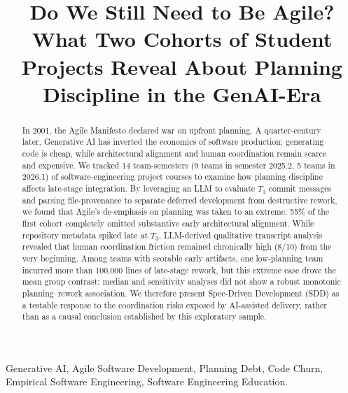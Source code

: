 \documentclass[conference]{IEEEtran}
\begin{document}
\raggedbottom

\title{Do We Still Need to Be Agile? What Two Cohorts of Student Projects Reveal About Planning Discipline in the GenAI-Era}

\author{
}

\maketitle

\begin{abstract}
In 2001, the Agile Manifesto declared war on upfront planning. A
quarter-century later, Generative AI has inverted the economics of
software production: generating code is cheap, while architectural 
alignment and human coordination remain scarce and expensive. We tracked
14 team-semesters (9 teams in semester 2025.2, 5 teams in 2026.1) of
software-engineering project courses to examine how planning discipline 
affects late-stage integration. By leveraging an LLM to evaluate $T_1$ 
commit messages and parsing file-provenance to separate deferred development 
from destructive rework, we found that Agile's de-emphasis on planning 
was taken to an extreme: 55\% of the first cohort completely omitted 
substantive early architectural alignment. While repository metadata 
spiked late at $T_3$, LLM-derived qualitative transcript analysis revealed 
that human coordination friction remained chronically high (8/10) from the 
very beginning. Among teams with scorable early artifacts, one low-planning
team incurred more than 100,000 lines of late-stage rework, but this extreme
case drove the mean group contrast: median and sensitivity analyses did not
show a robust monotonic planning--rework association. We therefore present
Spec-Driven Development (SDD) as a testable response to the coordination
risks exposed by AI-assisted delivery, rather than as a causal conclusion
established by this exploratory sample.
\end{abstract}

\begin{IEEEkeywords}
Generative AI, Agile Software Development, Planning Debt, Code Churn,
Empirical Software Engineering, Software Engineering Education.
\end{IEEEkeywords}
\end{document}
